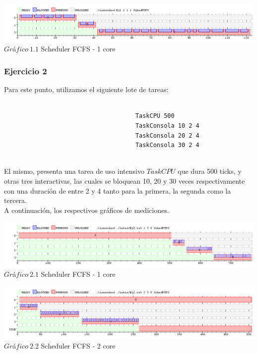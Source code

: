 \vspace*{0.3cm} \vspace*{0.3cm}
  \begin{center}
 \includegraphics[scale=0.5]{./Test/ej1.png}
 { $Gr$\'a$fico \ 1.1$ Scheduler FCFS - 1 core }
 \end{center}
  \vspace*{0.3cm}



\subsubsection[Resolución Ejercicio 2]{Ejercicio 2}

\indent Para este punto, utilizamos el siguiente lote de tareas:
\begin{verbatim}
 
                                     TaskCPU 500
                                     TaskConsola 10 2 4
                                     TaskConsola 20 2 4
                                     TaskConsola 30 2 4


\end{verbatim}

\indent El mismo, presenta una tarea de uso intensivo $TaskCPU$ que dura 500 ticks, y otras tres interactivas, las cuales se
bloquean 10, 20 y 30 veces respectivamente con una duración de entre 2 y 4 tanto para la primera, la segunda como la tercera.\\
A continuación, los respectivos gráficos de mediciones.


\vspace*{0.3cm} \vspace*{0.3cm}
  \begin{center}
 \includegraphics[scale=0.5]{ej21nucleo.png}
 { $Gr$\'a$fico \ 2.1$ Scheduler FCFS - 1 core }
 \end{center}
  \vspace*{0.3cm}
 
  
\vspace*{0.3cm} \vspace*{0.3cm}
  \begin{center}
 \includegraphics[scale=0.5]{ej22nucleo.png}
 { $Gr$\'a$fico \ 2.2$ Scheduler FCFS - 2 core }
 \end{center}
  \vspace*{0.3cm}
  
